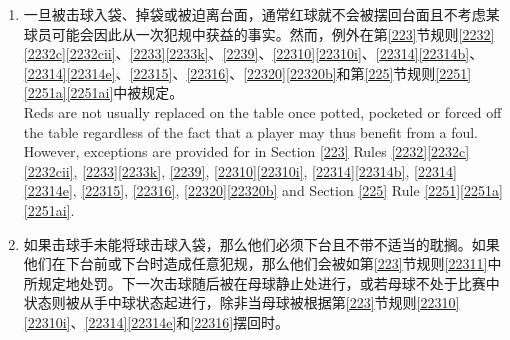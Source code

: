 \begin{enumerate}[label=(\alph*)]
\begin{enumerate}[label=(\roman*)]
        The break is continued by potting Reds and colours alternately until all the Reds are off the table and, where applicable, a colour has been played at following the potting of the last Red.
        \item \label{2233hiii}彩球随后根据第\ref{223}节规则\ref{2231}\ref{2231a}按其分值从低到高的顺序成为活球且在下一次被击球入袋时保持离开台面，除非是如第\ref{223}节规则\ref{2234}中所规定的[情形]，并且击球手对下一颗活球彩球进行下一次击球。\\
        The colours then become on in the ascending order of their value as per Section \ref{223} Rule \ref{2231}\ref{2231a} and when next potted remain off the table, except as provided for in Section \ref{223} Rule \ref{2234}, and the striker plays the next stroke at the next colour on.
        \item 如果, 在某次单杆中的, 击球手在裁判已在其他所有球都静止时完成将某彩球摆上点位前击打，那么该彩球的分数不应被记录并且第\ref{223}节规则\ref{22311}\ref{22311a}\ref{22311ai}或 \ref{22311}\ref{22311b}\ref{22311bii}应视情况适用。\\
        In the event that the striker, in a break, plays before the referee has completed spotting a colour while all other balls are at rest, the value of the colour shall not be scored and Section \ref{223} Rule \ref{22311}\ref{22311a} \ref{22311ai} or \ref{22311}\ref{22311b}\ref{22311bii} shall apply as appropriate.
    \end{enumerate}
    \item 一旦被击球入袋、掉袋或被迫离台面，通常红球就不会被摆回台面且不考虑某球员可能会因此从一次犯规中获益的事实。然而，例外在第\ref{223}节规则\ref{2232}\ref{2232c}\ref{2232cii}、\ref{2233}\ref{2233k}、\ref{2239}、\ref{22310}\ref{22310i}、\ref{22314}\ref{22314b}、\ref{22314}\ref{22314e}、\ref{22315}、\ref{22316}、\ref{22320}\ref{22320b}和第\ref{225}节规则\ref{2251}\ref{2251a}\ref{2251ai}中被规定。\\
    Reds are not usually replaced on the table once potted, pocketed or forced off the table regardless of the fact that a player may thus benefit from a foul. However, exceptions are provided for in Section \ref{223} Rules \ref{2232}\ref{2232c}\ref{2232cii}, \ref{2233}\ref{2233k}, \ref{2239}, \ref{22310}\ref{22310i}, \ref{22314}\ref{22314b}, \ref{22314}\ref{22314e}, \ref{22315}, \ref{22316}, \ref{22320}\ref{22320b} and Section \ref{225} Rule \ref{2251}\ref{2251a}\ref{2251ai}.
    \item 如果击球手未能将球击球入袋，那么他们必须下台且不带不适当的耽搁。如果他们在下台前或下台时造成任意犯规，那么他们会被如第\ref{223}节规则\ref{22311}中所规定地处罚。下一次击球随后被在母球静止处进行，或若母球不处于比赛中状态则被从手中球状态起进行，除非当母球被根据第\ref{223}节规则\ref{22310}\ref{22310i}、\ref{22314}\ref{22314e}和\ref{22316}摆回时。\\

\end{enumerate}
